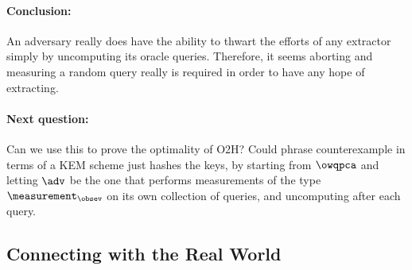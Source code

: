     \paragraph{Conclusion:} An adversary really does have the ability to thwart the efforts
      of any extractor simply by uncomputing its oracle queries.
      Therefore, it seems aborting and measuring a random query really is
      required in order to have any hope of extracting.

    \paragraph{Next question:} Can we use this to prove the optimality of O2H?
      Could phrase counterexample in terms of a KEM scheme just hashes the
      keys, by starting from $\owqpca$ and letting $\adv$ be the one that
      performs measurements of the type $\measurement_\obsev$ on its own
      collection of queries, and uncomputing after each query.

  \subsection{Connecting with the Real World}
